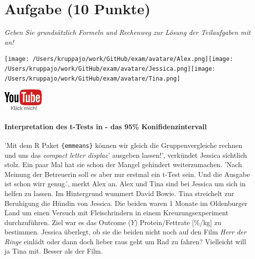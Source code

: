 \documentclass[a4paper, 9pt]{scrartcl}\usepackage[]{graphicx}\usepackage[]{xcolor}
\begin{document}
\section{Aufgabe \hfill (10 Punkte)}

\textit{Geben Sie grundsätzlich Formeln und Rechenweg zur Lösung der Teilaufgaben mit an!} \\[1Ex]
 

 
\begin{minipage}[t]{0.5\textwidth}
\texttt{[image: /Users/kruppajo/work/GitHub/exam/avatare/Alex.png]}\hspace{-4mm}\texttt{[image: /Users/kruppajo/work/GitHub/exam/avatare/Jessica.png]}\hspace{-4mm}\texttt{[image: /Users/kruppajo/work/GitHub/exam/avatare/Tina.png]}
\end{minipage}
\begin{minipage}[t]{0.5\textwidth}
\hfill
\href{https://youtu.be/wJqsNV1hOW8}{\includegraphics[width = 2cm]{img/youtube}}
\end{minipage}



\paragraph{Interpretation des t-Tests in \Rlogo - das 95\% Konifidenzintervall}


'Mit dem R Paket \texttt{\{emmeans\}} können wir gleich die Gruppenvergleiche rechnen und uns das \textit{compact letter displac}' ausgeben lassen!', verkündet Jessica sichtlich stolz. Ein paar Mal hat sie schon der Mangel gehindert weiterzumachen. 'Nach Meinung der Betreuerin soll es aber nur erstmal ein t-Test sein. Und die Ausgabe ist schon wirr genug.', merkt Alex an. Alex und Tina sind bei Jessica um sich in \Rlogo helfen zu lassen. Im Hintergrund wummert David Bowie. Tina streichelt zur Beruhigung die Hündin von Jessica. Die beiden waren 1 Monate im Oldenburger Land um einen Versuch mit Fleischrindern in einem Kreuzungsexperiment durchzuführen. Ziel war es das Outcome ($Y$) Protein/Fettrate [\%/kg] zu bestimmen. Jessica überlegt, ob sie die beiden nicht noch auf den Film \textit{Herr der Ringe} einlädt oder dann doch lieber raus geht um Rad zu fahren? Vielleicht will ja Tina mit. Besser als der Film.
\end{document}
